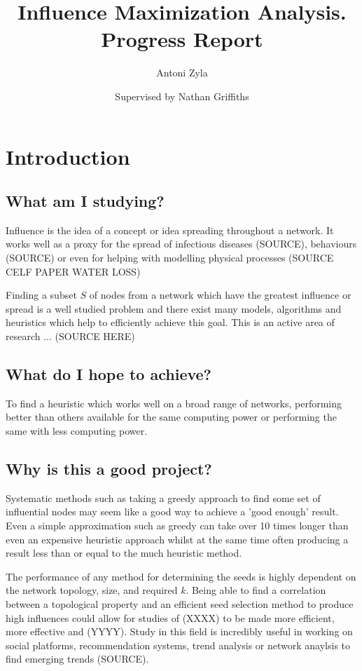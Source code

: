 \documentclass{article}
\title{\textbf{Influence Maximization Analysis. Progress Report}}
\author{Antoni Zyla \and Supervised by Nathan Griffiths}
\date{}
\begin{document}
\maketitle
\linespread{1.25}

\tableofcontents

\newpage

\section{Introduction}

\subsection{What am I studying?}

Influence is the idea of a concept or idea spreading throughout a network.
It works well as a proxy for the spread of infectious diseases (SOURCE), behaviours (SOURCE) or even for helping with modelling physical processes (SOURCE CELF PAPER WATER LOSS)

Finding a subset $S$ of nodes from a network which have the greatest influence or spread is a well studied problem and there exist many models, algorithms and heuristics which help to efficiently achieve this goal.
This is an active area of research ... (SOURCE HERE)

\subsection{What do I hope to achieve?}
To find a heuristic which works well on a broad range of networks, performing better than others available for the same computing power or performing the same with less computing power.

\subsection{Why is this a good project?}

Systematic methods such as taking a greedy approach to find some set of influential nodes may seem like a good way to achieve a 'good enough' result.
Even a simple approximation such as greedy can take over 10 times longer than even an expensive heuristic approach whilst at the same time often producing a result less than or equal to the much heuristic method.

The performance of any method for determining the seeds is highly dependent on the network topology, size, and required $k$.
Being able to find a correlation between a topological property and an efficient seed selection method to produce high influences could allow for studies of (XXXX) to be made more efficient, more effective and (YYYY).
Study in this field is incredibly useful in working on social platforms, recommendation systems, trend analysis or network anaylsis to find emerging trends (SOURCE).
\end{document}
